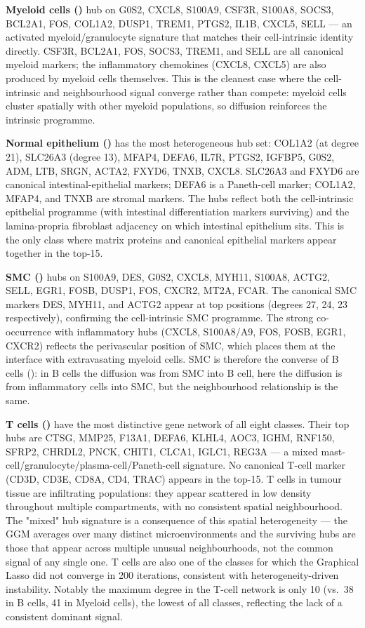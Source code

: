 \textbf{Myeloid cells ()} hub on G0S2, CXCL8, S100A9, CSF3R, S100A8, SOCS3, BCL2A1, FOS, COL1A2, DUSP1, TREM1, PTGS2, IL1B, CXCL5, SELL --- an activated myeloid/granulocyte signature that matches their cell-intrinsic identity directly. CSF3R, BCL2A1, FOS, SOCS3, TREM1, and SELL are all canonical myeloid markers; the inflammatory chemokines (CXCL8, CXCL5) are also produced by myeloid cells themselves. This is the cleanest case where the cell-intrinsic and neighbourhood signal converge rather than compete: myeloid cells cluster spatially with other myeloid populations, so diffusion reinforces the intrinsic programme.

\textbf{Normal epithelium ()} has the most heterogeneous hub set: COL1A2 (at degree 21), SLC26A3 (degree 13), MFAP4, DEFA6, IL7R, PTGS2, IGFBP5, G0S2, ADM, LTB, SRGN, ACTA2, FXYD6, TNXB, CXCL8. SLC26A3 and FXYD6 are canonical intestinal-epithelial markers; DEFA6 is a Paneth-cell marker; COL1A2, MFAP4, and TNXB are stromal markers. The hubs reflect both the cell-intrinsic epithelial programme (with intestinal differentiation markers surviving) and the lamina-propria fibroblast adjacency on which intestinal epithelium sits. This is the only class where matrix proteins and canonical epithelial markers appear together in the top-15.

\textbf{SMC ()} hubs on S100A9, DES, G0S2, CXCL8, MYH11, S100A8, ACTG2, SELL, EGR1, FOSB, DUSP1, FOS, CXCR2, MT2A, FCAR. The canonical SMC markers DES, MYH11, and ACTG2 appear at top positions (degrees 27, 24, 23 respectively), confirming the cell-intrinsic SMC programme. The strong co-occurrence with inflammatory hubs (CXCL8, S100A8/A9, FOS, FOSB, EGR1, CXCR2) reflects the perivascular position of SMC, which places them at the interface with extravasating myeloid cells. SMC is therefore the converse of B cells (): in B cells the diffusion was from SMC into B cell, here the diffusion is from inflammatory cells into SMC, but the neighbourhood relationship is the same.

\textbf{T cells ()} have the most distinctive gene network of all eight classes. Their top hubs are CTSG, MMP25, F13A1, DEFA6, KLHL4, AOC3, IGHM, RNF150, SFRP2, CHRDL2, PNCK, CHIT1, CLCA1, IGLC1, REG3A --- a mixed mast-cell/granulocyte/plasma-cell/Paneth-cell signature. No canonical T-cell marker (CD3D, CD3E, CD8A, CD4, TRAC) appears in the top-15. T cells in tumour tissue are infiltrating populations: they appear scattered in low density throughout multiple compartments, with no consistent spatial neighbourhood. The "mixed" hub signature is a consequence of this spatial heterogeneity --- the GGM averages over many distinct microenvironments and the surviving hubs are those that appear across multiple unusual neighbourhoods, not the common signal of any single one. T cells are also one of the classes for which the Graphical Lasso did not converge in 200 iterations, consistent with heterogeneity-driven instability. Notably the maximum degree in the T-cell network is only 10 (vs.\ 38 in B cells, 41 in Myeloid cells), the lowest of all classes, reflecting the lack of a consistent dominant signal.

